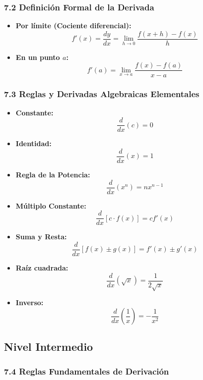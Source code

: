 \documentclass[11pt,a4paper]{article}
\begin{document}
\subsubsection*{7.2 Definición Formal de la Derivada}

\begin{itemize}
  \item \textbf{Por límite (Cociente diferencial):}
  \[
    f'(x) = \frac{dy}{dx} = \lim_{h \to 0} \frac{f(x + h) - f(x)}{h}
  \]
  \item \textbf{En un punto $a$:}
  \[
    f'(a) = \lim_{x \to a} \frac{f(x) - f(a)}{x - a}
  \]
\end{itemize}

\subsubsection*{7.3 Reglas y Derivadas Algebraicas Elementales}

\begin{itemize}
  \item \textbf{Constante:}
  \[
    \frac{d}{dx}(c) = 0
  \]
  \item \textbf{Identidad:}
  \[
    \frac{d}{dx}(x) = 1
  \]
  \item \textbf{Regla de la Potencia:}
  \[
    \frac{d}{dx}(x^n) = n x^{n - 1}
  \]
  \item \textbf{Múltiplo Constante:}
  \[
    \frac{d}{dx}[c \cdot f(x)] = c f'(x)
  \]
  \item \textbf{Suma y Resta:}
  \[
    \frac{d}{dx}[f(x) \pm g(x)] = f'(x) \pm g'(x)
  \]
  \item \textbf{Raíz cuadrada:}
  \[
    \frac{d}{dx}(\sqrt{x}) = \frac{1}{2\sqrt{x}}
  \]
  \item \textbf{Inverso:}
  \[
    \frac{d}{dx}\left(\frac{1}{x}\right) = -\frac{1}{x^2}
  \]
\end{itemize}

\subsection*{Nivel Intermedio}

\subsubsection*{7.4 Reglas Fundamentales de Derivación}
\end{document}
